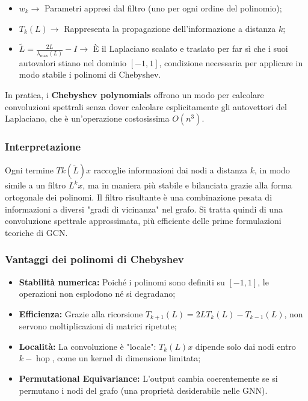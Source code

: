 \begin{itemize}
    \item $w_k \rightarrow$ Parametri appresi dal filtro (uno per ogni ordine del polinomio);
    \item $T_k(L) \rightarrow$ Rappresenta la propagazione dell’informazione a distanza $k$;
    \item $\tilde{L} = \frac{2L}{\lambda_{\text{max}}(L)} - I \rightarrow$ È il Laplaciano scalato e traslato per far sì che i suoi autovalori stiano nel dominio $[-1,1]$, condizione necessaria per applicare in modo stabile i polinomi di Chebyshev.
\end{itemize}
In pratica, i \textbf{Chebyshev polynomials} offrono un modo per calcolare convoluzioni spettrali senza dover calcolare esplicitamente gli autovettori del Laplaciano, che è un’operazione costosissima $O(n^3)$.

\subsubsection{Interpretazione}

Ogni termine $Tk(\tilde{L})x$ raccoglie informazioni dai nodi a distanza $k$, in modo simile a un filtro $L^kx$, ma in maniera più stabile e bilanciata grazie alla forma ortogonale dei polinomi. Il filtro risultante è una combinazione pesata di informazioni a diversi "gradi di vicinanza" nel grafo. Si tratta quindi di una convoluzione spettrale approssimata, più efficiente delle prime formulazioni teoriche di GCN.
\subsubsection{Vantaggi dei polinomi di Chebyshev}

\begin{itemize}
  \item \textbf{Stabilità numerica:} Poiché i polinomi sono definiti su $[-1,1]$, le operazioni non esplodono né si degradano;
  \item \textbf{Efficienza:} Grazie alla ricorsione $T_{k+1}(L)=2LT_k(L)-T_{k-1}(L)$, non servono moltiplicazioni di matrici ripetute;
  \item \textbf{Località:} La convoluzione è "locale": $T_k(L)x$ dipende solo dai nodi entro $k-\operatorname{hop}$, come un kernel di dimensione limitata;
  \item \textbf{Permutational Equivariance:} L’output cambia coerentemente se si permutano i nodi del grafo (una proprietà desiderabile nelle GNN).
\end{itemize}

